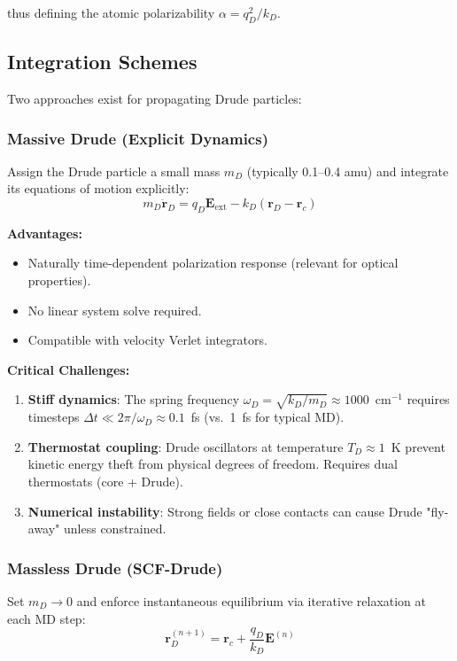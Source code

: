 \documentclass[11pt,letterpaper]{article}
\newcommand{\vr}{\mathbf{r}}
\newcommand{\vE}{\mathbf{E}}
\begin{document}
thus defining the atomic polarizability $\alpha = q_D^2 / k_D$.

\subsection{Integration Schemes}

Two approaches exist for propagating Drude particles:

\subsubsection{Massive Drude (Explicit Dynamics)}

Assign the Drude particle a small mass $m_D$ (typically 0.1--0.4 amu) and integrate its equations of motion explicitly:
\begin{equation}
m_D \ddot{\vr}_D = q_D \vE_{\text{ext}} - k_D (\vr_D - \vr_c)
\end{equation}

\textbf{Advantages:}
\begin{itemize}
    \item Naturally time-dependent polarization response (relevant for optical properties).
    \item No linear system solve required.
    \item Compatible with velocity Verlet integrators.
\end{itemize}

\textbf{Critical Challenges:}
\begin{enumerate}
    \item \textbf{Stiff dynamics}: The spring frequency $\omega_D = \sqrt{k_D / m_D} \approx 1000$~cm$^{-1}$ requires timesteps $\Delta t \ll 2\pi / \omega_D \approx 0.1$~fs (vs.\ 1~fs for typical MD).
    \item \textbf{Thermostat coupling}: Drude oscillators at temperature $T_D \approx 1$~K prevent kinetic energy theft from physical degrees of freedom. Requires dual thermostats (core + Drude)\cite{lamoureux2006}.
    \item \textbf{Numerical instability}: Strong fields or close contacts can cause Drude "fly-away" unless constrained.
\end{enumerate}

\subsubsection{Massless Drude (SCF-Drude)}

Set $m_D \to 0$ and enforce instantaneous equilibrium via iterative relaxation at each MD step:
\begin{equation}
\vr_D^{(n+1)} = \vr_c + \frac{q_D}{k_D} \vE^{(n)}
\end{equation}
\end{document}
